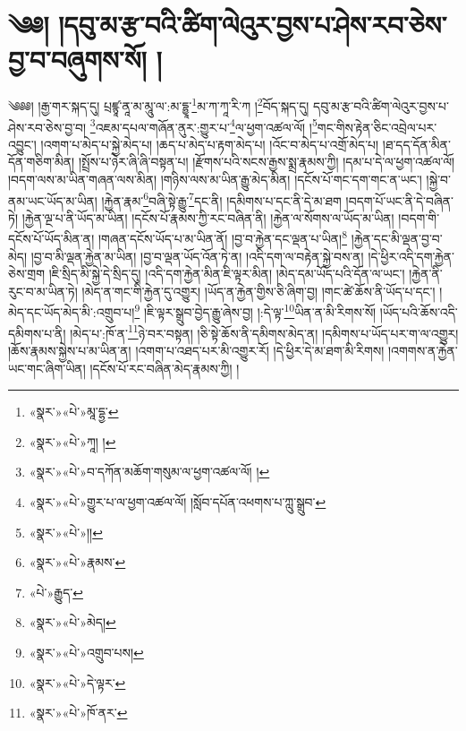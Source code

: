 \chapter{༄༅། །དབུ་མ་རྩ་བའི་ཚིག་ལེའུར་བྱས་པ་ཤེས་རབ་ཅེས་བྱ་བ་བཞུགས་སོ། །}༄༅༅། །རྒྱ་གར་སྐད་དུ། པྲཛྙཱ་ནཱ་མ་མཱུ་ལ་:མ་དྷྱཱ་\footnote{«སྣར་»«པེ་»མཱ་དྷྱ་}མ་ཀ་ཀཱ་རི་ཀ །\footnote{«སྣར་»«པེ་»ཀཱ། །}བོད་སྐད་དུ། དབུ་མ་རྩ་བའི་ཚིག་ལེའུར་བྱས་པ་ཤེས་རབ་ཅེས་བྱ་བ། \footnote{«སྣར་»«པེ་»བ་དཀོན་མཆོག་གསུམ་ལ་ཕྱག་འཚལ་ལོ། ། }འཇམ་དཔལ་གཞོན་ནུར་:གྱུར་པ་\footnote{«སྣར་»«པེ་»གྱུར་པ་ལ་ཕྱག་འཚལ་ལོ། །སློབ་དཔོན་འཕགས་པ་ཀླུ་སྒྲུབ་}ལ་ཕྱག་འཚལ་ལོ། །\footnote{«སྣར་»«པེ་»།།}གང་གིས་རྟེན་ཅིང་འབྲེལ་པར་འབྱུང་། །འགག་པ་མེད་པ་སྐྱེ་མེད་པ། །ཆད་པ་མེད་པ་རྟག་མེད་པ། །འོང་བ་མེད་པ་འགྲོ་མེད་པ། །ཐ་དད་དོན་མིན་དོན་གཅིག་མིན། །སྤྲོས་པ་ཉེར་ཞི་ཞི་བསྟན་པ། །རྫོགས་པའི་སངས་རྒྱས་སྨྲ་རྣམས་ཀྱི། །དམ་པ་དེ་ལ་ཕྱག་འཚལ་ལོ། །བདག་ལས་མ་ཡིན་གཞན་ལས་མིན། །གཉིས་ལས་མ་ཡིན་རྒྱུ་མེད་མིན། །དངོས་པོ་གང་དག་གང་ན་ཡང་། །སྐྱེ་བ་ནམ་ཡང་ཡོད་མ་ཡིན། །རྐྱེན་རྣམ་\footnote{«སྣར་»«པེ་»རྣམས་}བཞི་སྟེ་རྒྱུ་\footnote{«པེ་»རྒྱུད་}དང་ནི། །དམིགས་པ་དང་ནི་དེ་མ་ཐག །བདག་པོ་ཡང་ནི་དེ་བཞིན་ཏེ། །རྐྱེན་ལྔ་པ་ནི་ཡོད་མ་ཡིན། །དངོས་པོ་རྣམས་ཀྱི་རང་བཞིན་ནི། །རྐྱེན་ལ་སོགས་ལ་ཡོད་མ་ཡིན། །བདག་གི་དངོས་པོ་ཡོད་མིན་ན། །གཞན་དངོས་ཡོད་པ་མ་ཡིན་ནོ། །བྱ་བ་རྐྱེན་དང་ལྡན་པ་ཡིན།\footnote{«སྣར་»«པེ་»མེད།} །རྐྱེན་དང་མི་ལྡན་བྱ་བ་མེད། །བྱ་བ་མི་ལྡན་རྐྱེན་མ་ཡིན། །བྱ་བ་ལྡན་ཡོད་འོན་ཏེ་ན། །འདི་དག་ལ་བརྟེན་སྐྱེ་བས་ན། །དེ་ཕྱིར་འདི་དག་རྐྱེན་ཅེས་གྲག །ཇི་སྲིད་མི་སྐྱེ་དེ་སྲིད་དུ། །འདི་དག་རྐྱེན་མིན་ཇི་ལྟར་མིན། །མེད་དམ་ཡོད་པའི་དོན་ལ་ཡང་། །རྐྱེན་ནི་རུང་བ་མ་ཡིན་ཏེ། །མེད་ན་གང་གི་རྐྱེན་དུ་འགྱུར། །ཡོད་ན་རྐྱེན་གྱིས་ཅི་ཞིག་བྱ། །གང་ཚེ་ཆོས་ནི་ཡོད་པ་དང་། །མེད་དང་ཡོད་མེད་མི་:འགྲུབ་པ།\footnote{«སྣར་»«པེ་»འགྲུབ་པས།} །ཇི་ལྟར་སྒྲུབ་བྱེད་རྒྱུ་ཞེས་བྱ། །:དེ་ལྟ་\footnote{«སྣར་»«པེ་»དེ་ལྟར་}ཡིན་ན་མི་རིགས་སོ། །ཡོད་པའི་ཆོས་འདི་དམིགས་པ་ནི། །མེད་པ་:ཁོ་ན་\footnote{«སྣར་»«པེ་»ཁོ་ནར་}ཉེ་བར་བསྟན། །ཅི་སྟེ་ཆོས་ནི་དམིགས་མེད་ན། །དམིགས་པ་ཡོད་པར་ག་ལ་འགྱུར། །ཆོས་རྣམས་སྐྱེས་པ་མ་ཡིན་ན། །འགག་པ་འཐད་པར་མི་འགྱུར་རོ། །དེ་ཕྱིར་དེ་མ་ཐག་མི་རིགས། །འགགས་ན་རྐྱེན་ཡང་གང་ཞིག་ཡིན། །དངོས་པོ་རང་བཞིན་མེད་རྣམས་ཀྱི། །

